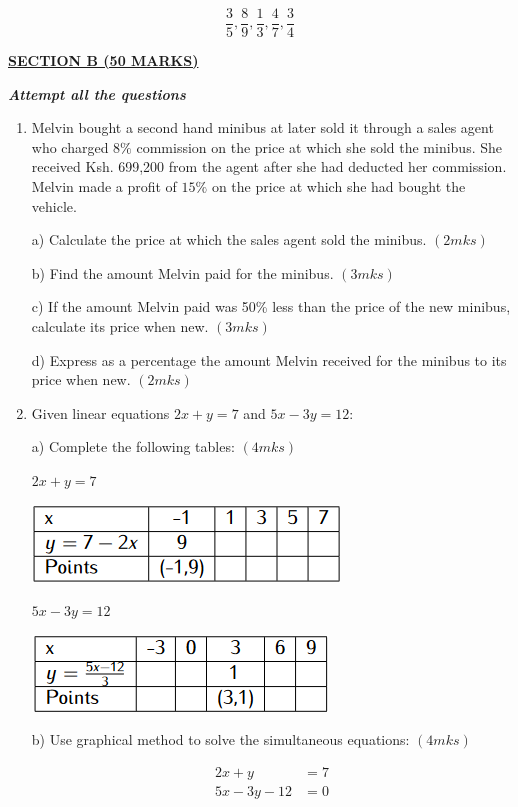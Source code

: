 \documentclass[
  a4paperpaper,
]{scrbook}
\begin{document}
\begin{tcolorbox}
\[ \frac{3}{5},\frac{8}{9},\frac{1}{3},\frac{4}{7},\frac{3}{4}\]

\ul{\textbf{SECTION B (50 MARKS)}}

\textbf{\emph{Attempt all the questions}}

\begin{enumerate}
\def\labelenumi{\arabic{enumi}.}
\setcounter{enumi}{16}
\item
  Melvin bought a second hand minibus at later sold it through a sales
  agent who charged \(8\%\) commission on the price at which she sold
  the minibus. She received Ksh. 699,200 from the agent after she had
  deducted her commission. Melvin made a profit of \(15\%\) on the price
  at which she had bought the vehicle.

  a) Calculate the price at which the sales agent sold the minibus.
  \((2mks)\)

  b) Find the amount Melvin paid for the minibus. \((3mks)\)

  c) If the amount Melvin paid was 50\% less than the price of the new
  minibus, calculate its price when new. \((3mks)\)

  d) Express as a percentage the amount Melvin received for the minibus
  to its price when new. \((2mks)\)
\item
  Given linear equations \(2x+y=7\) and \(5x-3y=12\):

  a) Complete the following tables: \((4mks)\)

  \(2x+y=7\)

  \includegraphics{figures/Md9_Q18a.png}

  \(5x-3y=12\)

  \includegraphics{figures/Md9_Q18b.png}

  b) Use graphical method to solve the simultaneous equations:
  \((4mks)\)

  \begin{equation}
  \begin {split}
  2x+y&=7\\
  5x-3y-12&=0
  \end{split}
  \end{equation}


\end{enumerate}
\end{tcolorbox}
\end{document}
